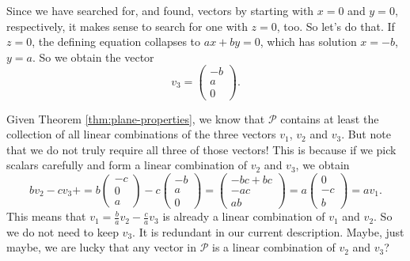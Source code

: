 \documentclass[00-livre-main.tex]{subfiles}
\begin{document}
Since we have searched for, and found, vectors by starting with $x=0$ and $y=0$, respectively, it makes sense to search for one with $z=0$, too. So let's do that. If $z=0$, the defining equation collapses to $ax+by=0$, which has solution $x=-b$, $y=a$. So we obtain the vector
\[
v_3 = \begin{pmatrix} -b \\ a \\ 0 \end{pmatrix}.
\]

Given Theorem \ref{thm:plane-properties}, we know that $\mathcal{P}$ contains at least the collection of all linear combinations of the three vectors $v_1$, $v_2$ and $v_3$. 
But note that we do not truly require all three of those vectors! This is because if we pick scalars carefully and form a linear combination of $v_2$ and $v_3$, we obtain
\[
bv_2 -cv_3 + = b\begin{pmatrix} -c\\ 0 \\ a \end{pmatrix} - c\begin{pmatrix} -b \\ a\\ 0 \end{pmatrix} = \begin{pmatrix} -bc+bc \\ -ac \\ ab\end{pmatrix} 
=a\begin{pmatrix} 0\\ -c \\ b  \end{pmatrix} = a v_1.
\]
This means that $v_1 = \frac{b}{a} v_2 - \frac{c}{a} v_3$ is already a linear combination of $v_1$ and $v_2$. So we do not need to keep $v_3$. It is redundant in our current description. Maybe, just maybe, we are lucky that any vector in $\mathcal{P}$ is a linear combination of $v_2$ and $v_3$?
\end{document}

